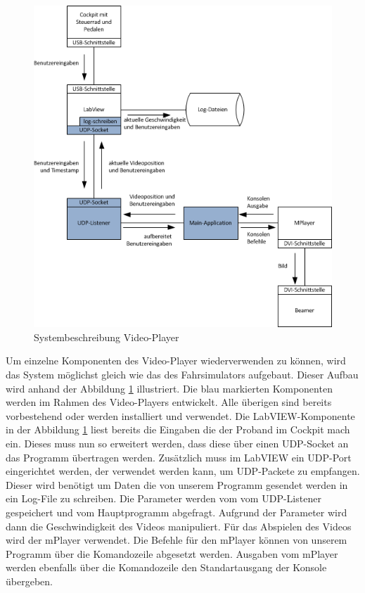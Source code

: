 \begin{figure}[H]
\centering 
\includegraphics{src/Systembeschreibung_VideoPlayer.png}
\caption{Systembeschreibung Video-Player} %
\label{Systembeschreibung Video-Player} %
\end{figure}
Um einzelne Komponenten des Video-Player wiederverwenden zu können, wird das System möglichst gleich wie das des Fahrsimulators aufgebaut. Dieser Aufbau wird anhand der Abbildung \ref{Systembeschreibung Video-Player} illustriert.  Die blau markierten Komponenten werden im Rahmen des Video-Players entwickelt. Alle überigen sind bereits vorbestehend oder werden installiert und verwendet. 
Die LabVIEW-Komponente in der Abbildung \ref{Systembeschreibung Video-Player} liest bereits die Eingaben die der Proband im Cockpit mach ein. Dieses muss nun so erweitert werden, dass diese über einen UDP-Socket an das Programm übertragen werden. Zusätzlich muss im LabVIEW ein UDP-Port eingerichtet werden, der verwendet werden kann, um UDP-Packete zu empfangen. Dieser wird benötigt um Daten die von unserem Programm gesendet werden in ein Log-File zu schreiben.
Die Parameter werden vom vom UDP-Listener gespeichert und vom Hauptprogramm abgefragt. Aufgrund der Parameter wird dann die Geschwindigkeit des Videos manipuliert. Für das Abspielen des Videos wird der mPlayer verwendet. Die Befehle für den mPlayer können von unserem Programm über die Komandozeile abgesetzt werden. Ausgaben vom mPlayer  werden ebenfalls über die Komandozeile den Standartausgang der Konsole übergeben. 

